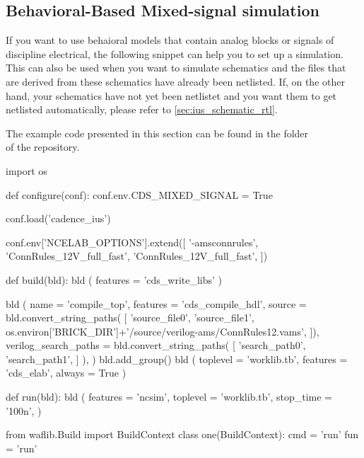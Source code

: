 \clearpage
\subsection{Behavioral-Based Mixed-signal simulation}
\label{sec:ius_behave_rtl}
If you want to use  behaioral models that contain analog blocks
or signals of discipline electrical, the following  snippet can
help you to set up a simulation. This  can also be used when you
want to simulate schematics and the  files that are derived
from these schematics have already been netlisted. If, on the other hand, your
schematics have not yet been netlistet and you want them to get netlisted
automatically, please refer to \cref{sec:ius_schematic_rtl}.

The example code presented in this section can be found in the folder\\
 of the repository.

\begin{lstwscript}
import os

def configure(conf):
    conf.env.CDS_MIXED_SIGNAL = True

    conf.load('cadence_ius')

    conf.env['NCELAB_OPTIONS'].extend([
        '-amsconnrules', 'ConnRules_12V_full_fast',
        'ConnRules_12V_full_fast',
    ])

def build(bld):
    bld ( features = 'cds_write_libs' )

    bld (
        name = 'compile_top',
        features = 'cds_compile_hdl',
        source = bld.convert_string_paths(
            [
                'source_file0',
                'source_file1',
                os.environ['BRICK_DIR']+'/source/verilog-ams/ConnRules12.vams',
            ]),
        verilog_search_paths = bld.convert_string_paths(
            [
                'search_path0',
                'search_path1',
            ]
        ),
    )
    bld.add_group()
    bld (
        toplevel = 'worklib.tb',
        features = 'cds_elab',
        always = True
    )   

def run(bld):
    bld (
        features = 'ncsim',
        toplevel = 'worklib.tb',
        stop_time = '100n',
    )   

from waflib.Build import BuildContext
class one(BuildContext):
    cmd = 'run'
    fun = 'run'
\end{lstwscript}

